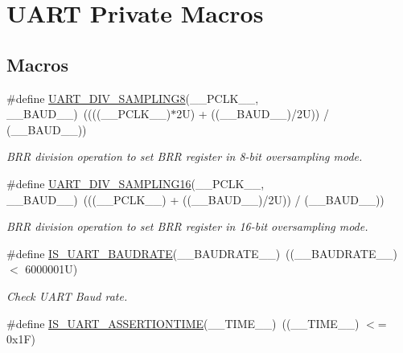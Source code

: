 \hypertarget{group___u_a_r_t___private___macros}{}\section{U\+A\+RT Private Macros}
\label{group___u_a_r_t___private___macros}
\subsection*{Macros}
\begin{DoxyCompactItemize}
\item 
\#define \hyperlink{group___u_a_r_t___private___macros_ga3b4ab2ec164132268de4719de4625a82}{U\+A\+R\+T\+\_\+\+D\+I\+V\+\_\+\+S\+A\+M\+P\+L\+I\+N\+G8}(\+\_\+\+\_\+\+P\+C\+L\+K\+\_\+\+\_\+,  \+\_\+\+\_\+\+B\+A\+U\+D\+\_\+\+\_\+)~((((\+\_\+\+\_\+\+P\+C\+L\+K\+\_\+\+\_\+)$\ast$2\+U) + ((\+\_\+\+\_\+\+B\+A\+U\+D\+\_\+\+\_\+)/2\+U)) / (\+\_\+\+\_\+\+B\+A\+U\+D\+\_\+\+\_\+))
\begin{DoxyCompactList}\small\item\em B\+RR division operation to set B\+RR register in 8-\/bit oversampling mode. \end{DoxyCompactList}\item 
\#define \hyperlink{group___u_a_r_t___private___macros_gac2423ff86559eb91198bcc438caec865}{U\+A\+R\+T\+\_\+\+D\+I\+V\+\_\+\+S\+A\+M\+P\+L\+I\+N\+G16}(\+\_\+\+\_\+\+P\+C\+L\+K\+\_\+\+\_\+,  \+\_\+\+\_\+\+B\+A\+U\+D\+\_\+\+\_\+)~(((\+\_\+\+\_\+\+P\+C\+L\+K\+\_\+\+\_\+) + ((\+\_\+\+\_\+\+B\+A\+U\+D\+\_\+\+\_\+)/2\+U)) / (\+\_\+\+\_\+\+B\+A\+U\+D\+\_\+\+\_\+))
\begin{DoxyCompactList}\small\item\em B\+RR division operation to set B\+RR register in 16-\/bit oversampling mode. \end{DoxyCompactList}\item 
\#define \hyperlink{group___u_a_r_t___private___macros_gaa8f50c3cc4c04875ea490fb81a08731d}{I\+S\+\_\+\+U\+A\+R\+T\+\_\+\+B\+A\+U\+D\+R\+A\+TE}(\+\_\+\+\_\+\+B\+A\+U\+D\+R\+A\+T\+E\+\_\+\+\_\+)~((\+\_\+\+\_\+\+B\+A\+U\+D\+R\+A\+T\+E\+\_\+\+\_\+) $<$ 6000001\+U)
\begin{DoxyCompactList}\small\item\em Check U\+A\+RT Baud rate. \end{DoxyCompactList}\item 
\#define \hyperlink{group___u_a_r_t___private___macros_ga8acf6b6648717b7192439f1b426321a4}{I\+S\+\_\+\+U\+A\+R\+T\+\_\+\+A\+S\+S\+E\+R\+T\+I\+O\+N\+T\+I\+ME}(\+\_\+\+\_\+\+T\+I\+M\+E\+\_\+\+\_\+)~((\+\_\+\+\_\+\+T\+I\+M\+E\+\_\+\+\_\+) $<$= 0x1\+F)

\end{DoxyCompactItemize}
